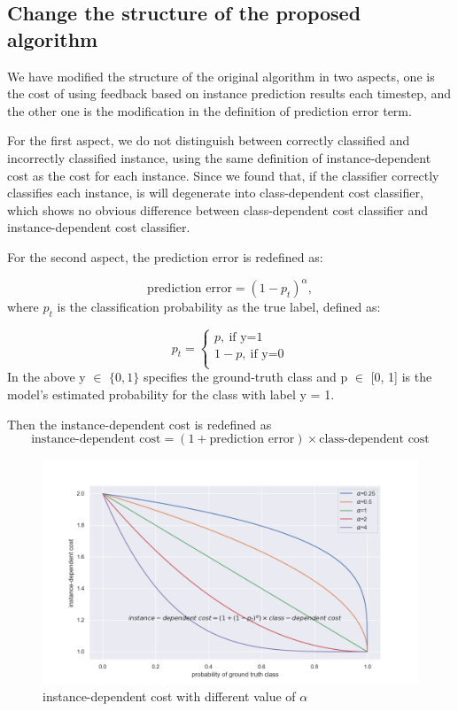 \documentclass{article}
\begin{document}
\subsection{Change the structure of the proposed algorithm}

We have modified the structure of the original algorithm in two aspects, one is the cost of using feedback based on instance prediction results each timestep, and the other one is the modification in the definition of prediction error term.

For the first aspect, we do not distinguish between correctly classified and incorrectly classified instance, using the same definition of instance-dependent cost as the cost for each instance. Since we found that, if the classifier correctly classifies each instance, is will degenerate into class-dependent cost classifier, which shows no obvious difference between class-dependent cost classifier and instance-dependent cost classifier.


For the second aspect, the prediction error is redefined as: 

\begin{equation}
	\text{prediction error} = (1 - p_t)^\alpha,
\end{equation}
 where $p_t$ is the classification probability as the true label, defined as:
 
 \begin{equation}
 	p_t = 
 	\begin{cases}
 		p, \ \text{if y=1}\\
 		1-p, \ \text{if y=0}\\
 	\end{cases}
 \end{equation}
  In the above y $\in$ $\{ 0, 1\}$ specifies the ground-truth class and p $\in$ [0, 1] is the model's estimated probability for the class with label y = 1.

Then the instance-dependent cost is redefined as 
 \begin{equation}
 	\text{instance-dependent cost}= (1+ \text{prediction error})\times \text{class-dependent cost}
 \end{equation}

\begin{figure}[tbh]
	\centering
	\includegraphics[width=1\linewidth]{"in"}
	\caption{instance-dependent cost with different value of $\alpha$}
	\label{fig:instance-dependent-cost-with-different-value-of-alpha}
\end{figure}
\end{document}
